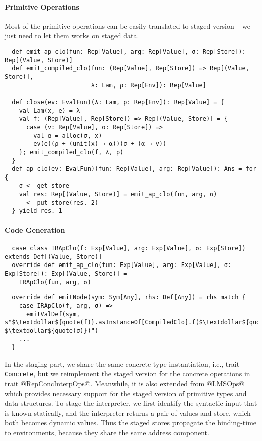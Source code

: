 \paragraph{Primitive Operations} Most of the primitive operations can be easily
translated to staged version -- we just need to let them works on staged data.

\begin{lstlisting}
  def emit_ap_clo(fun: Rep[Value], arg: Rep[Value], σ: Rep[Store]): Rep[(Value, Store)]
  def emit_compiled_clo(fun: (Rep[Value], Rep[Store]) => Rep[(Value, Store)],
                        λ: Lam, ρ: Rep[Env]): Rep[Value]

  def close(ev: EvalFun)(λ: Lam, ρ: Rep[Env]): Rep[Value] = {
    val Lam(x, e) = λ
    val f: (Rep[Value], Rep[Store]) => Rep[(Value, Store)] = {
      case (v: Rep[Value], σ: Rep[Store]) =>
        val α = alloc(σ, x)
        ev(e)(ρ + (unit(x) → α))(σ + (α → v))
    }; emit_compiled_clo(f, λ, ρ)
  }
  def ap_clo(ev: EvalFun)(fun: Rep[Value], arg: Rep[Value]): Ans = for {
    σ <- get_store
    val res: Rep[(Value, Store)] = emit_ap_clo(fun, arg, σ)
    _ <- put_store(res._2)
  } yield res._1
\end{lstlisting}

\paragraph{Code Generation}

\begin{lstlisting}
  case class IRApClo(f: Exp[Value], arg: Exp[Value], σ: Exp[Store]) extends Def[(Value, Store)]
  override def emit_ap_clo(fun: Exp[Value], arg: Exp[Value], σ: Exp[Store]): Exp[(Value, Store)] =
    IRApClo(fun, arg, σ)
\end{lstlisting}

\begin{lstlisting}
  override def emitNode(sym: Sym[Any], rhs: Def[Any]) = rhs match {
    case IRApClo(f, arg, σ) =>
      emitValDef(sym, s"$\textdollar${quote(f)}.asInstanceOf[CompiledClo].f($\textdollar${quote(arg)}, $\textdollar${quote(σ)})")
    ...
  }
\end{lstlisting}


In the staging part, we share the same concrete type instantiation, i.e., trait
\texttt{Concrete}, but we reimplement the staged version for the concrete
operations in trait @RepConcInterpOps@. Meanwhile, it is also extended from
@LMSOps@ which provides necessary support for the staged version of primitive
types and data structures. To stage the interpreter, we first identify the
syntactic input that is known statically, and the interpreter returns a pair of
values and store, which both becomes dynamic values. Thus the staged stores
propagate the binding-time to environments, because they share the same address
component.


